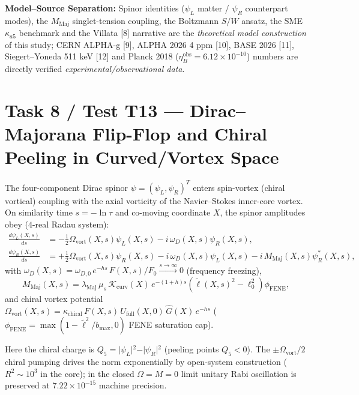 \documentclass[12pt,a4paper]{article}
\begin{document}
\textbf{Model--Source Separation:} Spinor identities ($\psi_L$ matter / $\psi_R$ counterpart modes), the $M_{\mathrm{Maj}}$ singlet-tension coupling, the Boltzmann $S/W$ ansatz, the SME $\kappa_{a5}$ benchmark and the Villata [8] narrative are the \textit{theoretical model construction} of this study; CERN ALPHA-g [9], ALPHA 2026 4 ppm [10], BASE 2026 [11], Siegert--Yoneda 511 keV [12] and Planck 2018 ($\eta_B^{\mathrm{obs}} = 6.12 \times 10^{-10}$) numbers are directly verified \textit{experimental/observational data}.

\section{Task 8 / Test T13 --- Dirac--Majorana Flip-Flop and Chiral Peeling in Curved/Vortex Space}

The four-component Dirac spinor $\psi = (\psi_L, \psi_R)^T$ enters spin-vortex (chiral vortical) coupling with the axial vorticity of the Navier--Stokes inner-core vortex. On similarity time $s = -\ln \tau$ and co-moving coordinate $X$, the spinor amplitudes obey ($4$-real Radau system):
\begin{equation}
\begin{split}
\frac{d \psi_L(X, s)}{ds} &= -\frac{1}{2} \Omega_{\mathrm{vort}}(X, s) \psi_L(X, s) - i \, \omega_D(X, s) \psi_R(X, s), \\
\frac{d \psi_R(X, s)}{ds} &= +\frac{1}{2} \Omega_{\mathrm{vort}}(X, s) \psi_R(X, s) - i \, \omega_D(X, s) \psi_L(X, s) - i \, M_{\mathrm{Maj}}(X, s) \psi_R^*(X, s),
\end{split}
\label{eq:dirac}
\end{equation}
with $\omega_D(X, s) = \omega_{D,0} \, e^{-h s} \, F(X, s)/F_0 \xrightarrow{s \to \infty} 0$ (frequency freezing),
\begin{equation}
M_{\mathrm{Maj}}(X, s) = \lambda_{\mathrm{Maj}} \, \mu_s \, \mathcal{K}_{\mathrm{curv}}(X) \, e^{-(1+h)s} \left(\tilde{\ell}(X, s)^2 - \ell_0^2\right) \phi_{\mathrm{FENE}},
\label{eq:mmaj}
\end{equation}
and chiral vortex potential $\Omega_{\mathrm{vort}}(X, s) = \kappa_{\mathrm{chiral}} \, F(X, s) \, U_{\mathrm{full}}(X, 0) \, \hat{G}(X) \, e^{-h s}$ ($\phi_{\mathrm{FENE}} = \max(1-\tilde{\ell}^2/b_{\max}, 0)$ FENE saturation cap).

Here the chiral charge is $Q_5 = \vert{}\psi_L\vert{}^2 - \vert{}\psi_R\vert{}^2$ (peeling points $Q_5 < 0$). The $\pm \Omega_{\mathrm{vort}}/2$ chiral pumping drives the norm exponentially by open-system construction ($R^2 \sim 10^3$ in the core); in the closed $\Omega = M = 0$ limit unitary Rabi oscillation is preserved at $7.22 \times 10^{-15}$ machine precision.
\end{document}
